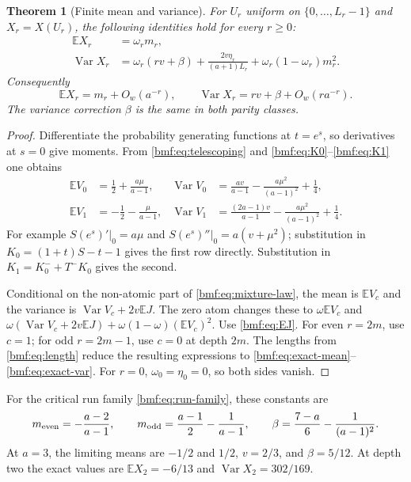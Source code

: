 \documentclass[11pt]{article}
\numberwithin{equation}{section}
\newtheorem{theorem}{Theorem}[section]
\theoremstyle{definition}
\theoremstyle{remark}
\newcommand{\E}{\mathbb E}
\newcommand{\Var}{\operatorname{Var}}
\begin{document}
\begin{theorem}[Finite mean and variance]\label{bmf:thm:moments}
For $U_r$ uniform on $\{0,\ldots,L_r-1\}$ and
$X_r=X(U_r)$, the following identities hold for every $r\geq0$:
\begin{align}
 \E X_r&=\omega_r m_r,\label{bmf:eq:exact-mean}\\
 \Var X_r&=
 \omega_r(rv+\beta)
 +\frac{2v\eta_r}{(a+1)L_r}
 +\omega_r(1-\omega_r)m_r^2.\label{bmf:eq:exact-var}
\end{align}
Consequently
\begin{equation}\label{bmf:eq:moment-asym}
 \E X_r=m_r+O_w(a^{-r}),\qquad
 \Var X_r=rv+\beta+O_w(ra^{-r}).
\end{equation}
The variance correction $\beta$ is the same in both parity classes.
\end{theorem}
\begin{proof}
Differentiate the probability generating functions at $t=e^s$,
so derivatives at $s=0$ give moments. From \eqref{bmf:eq:telescoping}
and \eqref{bmf:eq:K0}--\eqref{bmf:eq:K1} one obtains
\begin{align*}
 \E V_0&=\frac12+\frac{a\mu}{a-1},&
 \Var V_0&=\frac{av}{a-1}-\frac{a\mu^2}{(a-1)^2}+\frac14,\\
 \E V_1&=-\frac12-\frac{\mu}{a-1},&
 \Var V_1&=\frac{(2a-1)v}{a-1}
                 -\frac{a\mu^2}{(a-1)^2}+\frac14.
\end{align*}
For example $S(e^s)'|_0=a\mu$ and
$S(e^s)''|_0=a(v+\mu^2)$; substitution in
$K_0=(1+t)S-t-1$ gives the first row directly.
Substitution in $K_1=K_0^-+T^-K_0$ gives the second.

Conditional on the non-atomic part of \eqref{bmf:eq:mixture-law},
the mean is $\E V_c$ and the variance is
$\Var V_c+2v\E J$. The zero atom changes these to
$\omega\E V_c$ and
$\omega(\Var V_c+2v\E J)+\omega(1-\omega)(\E V_c)^2$.
Use \eqref{bmf:eq:EJ}. For even $r=2m$, use $c=1$; for odd
$r=2m-1$, use $c=0$ at depth $2m$. The lengths from
\eqref{bmf:eq:length} reduce the resulting expressions to
\eqref{bmf:eq:exact-mean}--\eqref{bmf:eq:exact-var}.
For $r=0$, $\omega_0=\eta_0=0$, so both sides vanish.
\end{proof}

For the critical run family \eqref{bmf:eq:run-family}, these constants are
\begin{equation}\label{bmf:eq:run-moments}
 m_{\rm even}=-\frac{a-2}{a-1},\qquad
 m_{\rm odd}=\frac{a-1}{2}-\frac1{a-1},\qquad
 \beta=\frac{7-a}{6}-\frac1{(a-1)^2}.
\end{equation}
At $a=3$, the limiting means are $-1/2$ and $1/2$,
$v=2/3$, and $\beta=5/12$. At depth two the exact values are
$\E X_2=-6/13$ and $\Var X_2=302/169$.
\end{document}
